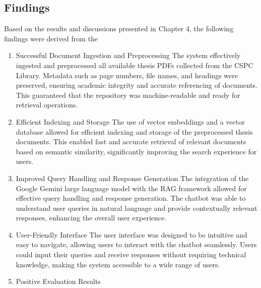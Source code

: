 \begin{refsection}
\section{Findings}
Based on the results and discussions presented in Chapter 4, the following findings were derived from the
\begin{enumerate}
    \item Successful Document Ingestion and Preprocessing
The system effectively ingested and preprocessed all available thesis PDFs collected from the CSPC Library. Metadata such as page numbers, file names, and headings were preserved, ensuring academic integrity and accurate referencing of documents. This guaranteed that the repository was machine-readable and ready for retrieval operations.
    \item Efficient Indexing and Storage
The use of vector embeddings and a vector database allowed for efficient indexing and storage of the preprocessed thesis documents. This enabled fast and accurate retrieval of relevant documents based on semantic similarity, significantly improving the search experience for users.
    \item Improved Query Handling and Response Generation
The integration of the Google Gemini large language model with the RAG framework allowed for effective query handling and response generation. The chatbot was able to understand user queries in natural language and provide contextually relevant responses, enhancing the overall user experience.
    \item User-Friendly Interface
The user interface was designed to be intuitive and easy to navigate, allowing users to interact with the chatbot seamlessly. Users could input their queries and receive responses without requiring technical knowledge, making the system accessible to a wide range of users.
    \item Positive Evaluation Results
\end{enumerate}


\end{refsection}
